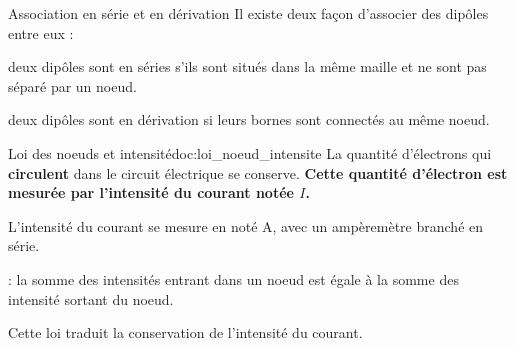

\begin{doc}{Association en série et en dérivation}
  Il existe deux façon d'associer des dipôles entre eux :
  \begin{listePoints}
    \item deux dipôles sont en séries s'ils sont situés dans la même maille et ne sont pas séparé par un noeud.
    \item deux dipôles sont en dérivation si leurs bornes sont connectés au même noeud.
  \end{listePoints}
\end{doc}

\newpage
\vspace*{-28pt}


\begin{doc}{Loi des noeuds et intensité}{doc:loi_noeud_intensite}
  \chevron La quantité d'électrons qui \textbf{circulent} dans le circuit électrique se conserve.
  \textbf{Cette quantité d'électron est mesurée par l'intensité du courant notée $I$.}
  \begin{importants}
    L'intensité du courant se mesure en  noté A, avec un ampèremètre branché en série.
  \end{importants}
  \begin{importants}
     : la somme des intensités entrant dans un noeud est égale à la somme des intensité sortant du noeud.
  \end{importants}
  Cette loi traduit la conservation de l'intensité du courant.
\end{doc}



